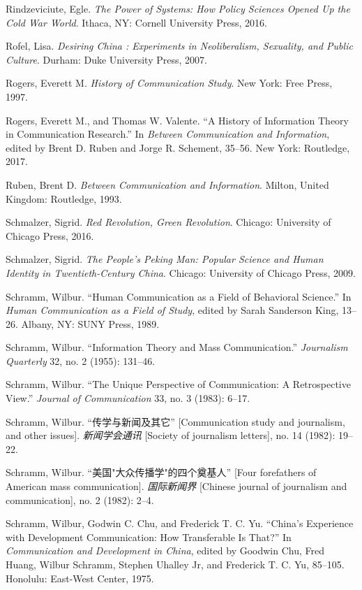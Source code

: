 \documentclass{tufte-handout}
\begin{document}
\begin{hangparas}{.25in}{1}
\begin{CJK*}{UTF8}{gbsn}
Rindzeviciute, Egle. \emph{The Power of Systems: How Policy Sciences
Opened Up the Cold War World}. Ithaca, NY: Cornell University Press,
2016.

Rofel, Lisa. \emph{Desiring China : Experiments in Neoliberalism,
Sexuality, and Public Culture}. Durham: Duke University Press, 2007.

Rogers, Everett M. \emph{History of Communication Study}. New York: Free
Press, 1997.

Rogers, Everett M., and Thomas W. Valente. ``A History of Information
Theory in Communication Research.'' In \emph{Between Communication and
Information}, edited by Brent D. Ruben and Jorge R. Schement, 35--56.
New York: Routledge, 2017.

Ruben, Brent D. \emph{Between Communication and Information}. Milton,
United Kingdom: Routledge, 1993.

Schmalzer, Sigrid. \emph{Red Revolution, Green Revolution}. Chicago:
University of Chicago Press, 2016.

Schmalzer, Sigrid. \emph{The People's Peking Man: Popular Science and
Human Identity in Twentieth-Century China}. Chicago: University of
Chicago Press, 2009.

Schramm, Wilbur. ``Human Communication as a Field of Behavioral
Science.'' In \emph{Human Communication as a Field of Study}, edited by
Sarah Sanderson King, 13--26. Albany, NY: SUNY Press, 1989.

Schramm, Wilbur. ``Information Theory and Mass Communication.''
\emph{Journalism Quarterly} 32, no. 2 (1955): 131--46.

Schramm, Wilbur. ``The Unique Perspective of Communication: A
Retrospective View.'' \emph{Journal of Communication} 33, no. 3 (1983):
6--17.

Schramm, Wilbur. ``传学与新闻及其它'' {[}Communication study and
journalism, and other issues{]}. \emph{新闻学会通讯} {[}Society of
journalism letters{]}, no. 14 (1982): 19--22.

Schramm, Wilbur. ``美国"大众传播学"的四个奠基人'' {[}Four forefathers of
American mass communication{]}. \emph{国际新闻界} {[}Chinese journal of
journalism and communication{]}, no. 2 (1982): 2--4.

Schramm, Wilbur, Godwin C. Chu, and Frederick T. C. Yu. ``China's
Experience with Development Communication: How Transferable Is That?''
In \emph{Communication and Development in China}, edited by Goodwin Chu,
Fred Huang, Wilbur Schramm, Stephen Uhalley Jr, and Frederick T. C. Yu,
85--105. Honolulu: East-West Center, 1975.


\end{CJK*}
\end{hangparas}
\end{document}
